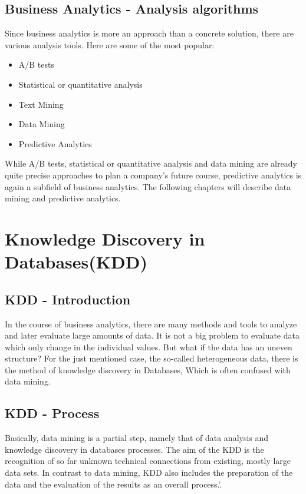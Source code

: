 \documentclass[12pt,twocolumn,twoside]{conference}   %
\begin{document}
\subsection{Business Analytics - Analysis algorithms}
Since business analytics is more an approach than a concrete solution, there are various analysis tools. Here are some of the most popular:

\begin{itemize}
\item A/B tests
\item Statistical or quantitative analysis
\item Text Mining
\item Data Mining
\item Predictive Analytics
\end{itemize}

While A/B tests, statistical or quantitative analysis and data mining are already quite precise approaches to plan a company's future course, predictive analytics is again a subfield of business analytics. The following chapters will describe data mining and predictive analytics.

\section{Knowledge Discovery in Databases(KDD) }
\subsection{KDD - Introduction}
In the course of business analytics, there are many methods and tools to analyze and later evaluate large amounts of data. It is not a big problem to evaluate data which only change in the individual values. But what if the data has an uneven structure? For the just mentioned case, the so-called heterogeneous data, there is the method of knowledge discovery in Databases, Which is often confused with data mining. 

\subsection{KDD - Process}
Basically, data mining is a partial step, namely that of data analysis and knowledge discovery in databases processes. The aim of the KDD is the recognition of so far unknown technical connections from existing, mostly large data sets. In contrast to data mining, KDD also includes the preparation of the data and the evaluation of the results as an overall process.'. \cite{KDD}
\end{document}
